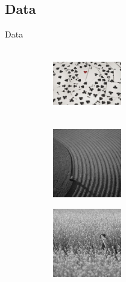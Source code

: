\documentclass{beamer}
\theoremstyle{plain}
\theoremstyle{definition}
\theoremstyle{plain}
\theoremstyle{plain}
\begin{document}
\subsection{Data}
\begin{frame}{Data}
\begin{figure}[t!] %
\begin{subfigure}{0.32\textwidth}
\includegraphics[height=3cm,width=3cm]{./Figures/card.jpg}
\caption{} \label{fig:a}
\end{subfigure}\hspace*{\fill}
\begin{subfigure}{0.32\textwidth}
\includegraphics[height=3cm,width=3cm]{./Figures/field.jpg}
\caption{} \label{fig:b}
\end{subfigure}
\begin{subfigure}{0.32\textwidth}
\includegraphics[height=3cm,width=3cm]{./Figures/girl.jpg}
\caption{} \label{fig:c}
\end{subfigure}


\end{figure}
\end{frame}
\end{document}
